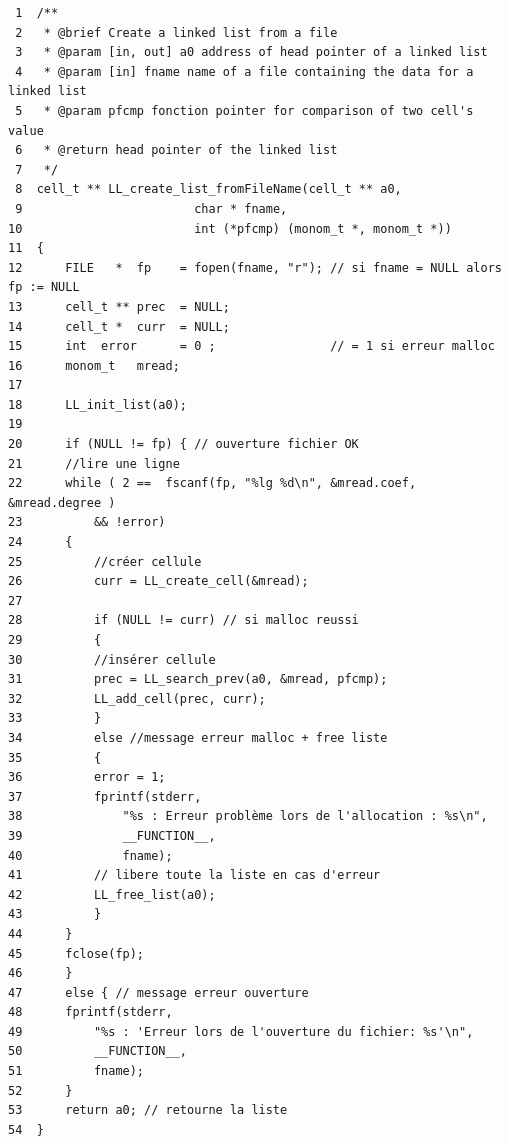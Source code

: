\documentclass[11pt]{article}
\begin{document}
\begin{enumerate}
\begin{verbatim}
 1  /**
 2   * @brief Create a linked list from a file
 3   * @param [in, out] a0 address of head pointer of a linked list
 4   * @param [in] fname name of a file containing the data for a linked list
 5   * @param pfcmp fonction pointer for comparison of two cell's value
 6   * @return head pointer of the linked list
 7   */
 8  cell_t ** LL_create_list_fromFileName(cell_t ** a0,
 9  				      char * fname,
10  				      int (*pfcmp) (monom_t *, monom_t *))
11  {
12      FILE   *  fp    = fopen(fname, "r"); // si fname = NULL alors fp := NULL 
13      cell_t ** prec  = NULL;
14      cell_t *  curr  = NULL;
15      int  error      = 0 ;                // = 1 si erreur malloc
16      monom_t   mread;
17  
18      LL_init_list(a0);
19  
20      if (NULL != fp) { // ouverture fichier OK
21  	//lire une ligne
22  	while ( 2 ==  fscanf(fp, "%lg %d\n", &mread.coef, &mread.degree )
23  		&& !error)
24  	{
25  	    //créer cellule
26  	    curr = LL_create_cell(&mread);
27  
28  	    if (NULL != curr) // si malloc reussi
29  	    {
30  		//insérer cellule
31  		prec = LL_search_prev(a0, &mread, pfcmp);
32  		LL_add_cell(prec, curr);
33  	    }
34  	    else //message erreur malloc + free liste
35  	    {
36  		error = 1;
37  		fprintf(stderr,
38  			"%s : Erreur problème lors de l'allocation : %s\n",
39  			__FUNCTION__,
40  			fname);
41  		// libere toute la liste en cas d'erreur
42  		LL_free_list(a0);
43  	    }	
44  	}
45  	fclose(fp);
46      }
47      else { // message erreur ouverture
48  	fprintf(stderr,
49  		"%s : 'Erreur lors de l'ouverture du fichier: %s'\n",
50  		__FUNCTION__,
51  		fname);
52      }
53      return a0; // retourne la liste
54  }
\end{verbatim}


\end{enumerate}
\end{document}
